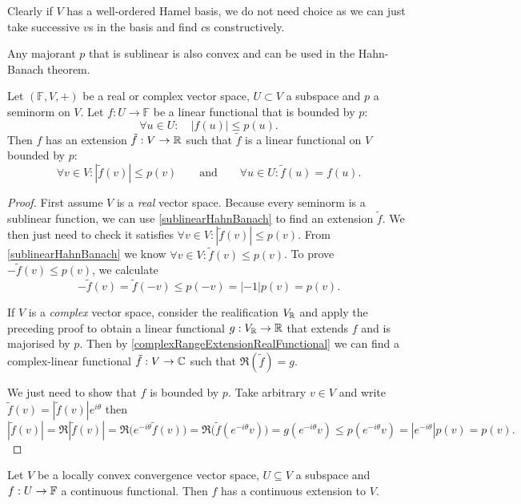 Clearly if $V$ has a well-ordered Hamel basis, we do not need choice as we can just take successive $v$s in the basis and find $c$s constructively.
\begin{corollary} \label{sublinearHahnBanach}
Any majorant $p$ that is sublinear is also convex and can be used in the Hahn-Banach theorem.
\end{corollary}
\begin{corollary} \label{seminormHahnBanach}
Let $(\mathbb{F},V,+)$ be a real or complex vector space, $U\subset V$ a subspace and $p$ a seminorm on $V$. Let $f:U\to\mathbb{F}$ be a linear functional that is bounded by $p$:
\[ \forall u\in U: \quad |f(u)| \leq p(u). \]
Then $f$ has an extension $\tilde{f}: V\to \mathbb{R}$ such that $\tilde{f}$ is a linear functional on $V$ bounded by $p$:
\[ \forall v\in V: |\tilde{f}(v)| \leq p(v) \qquad \text{and} \qquad \forall u\in U: \tilde{f}(u) = f(u). \]
\end{corollary}
\begin{proof}
First assume $V$ is a \emph{real} vector space. Because every seminorm is a sublinear function, we can use \ref{sublinearHahnBanach} to find an extension $\tilde{f}$. We then just need to check it satisfies $\forall v\in V: |\tilde{f}(v)| \leq p(v)$.
From \ref{sublinearHahnBanach} we know $\forall v\in V: \tilde{f}(v) \leq p(v)$.
To prove $-\tilde{f}(v) \leq p(v)$, we calculate
\[ -\tilde{f}(v) = \tilde{f}(-v) \leq p(-v) = |-1|p(v) = p(v). \]

If $V$ is a \emph{complex} vector space, consider the realification $V_{\mathbb{R}}$ and apply the preceding proof to obtain a linear functional $g: V_{\mathbb{R}} \to \mathbb{R}$ that extends $f$ and is majorised by $p$. Then by \ref{complexRangeExtensionRealFunctional} we can find a complex-linear functional $\tilde{f}:V \to \mathbb{C}$ such that $\Re(\tilde{f}) = g$.

We just need to show that $f$ is bounded by $p$. Take arbitrary $v\in V$ and write $\tilde{f}(v) = |\tilde{f}(v)|e^{i\theta}$ then
\[ |\tilde{f}(v)| = \Re|\tilde{f}(v)| = \Re\Big(e^{-i\theta}\tilde{f}(v)\Big) = \Re\Big(\tilde{f}(e^{-i\theta}v)\Big) = g(e^{-i\theta}v) \leq p(e^{-i\theta}v) = |e^{-i\theta}|p(v) = p(v). \]
\end{proof}
\begin{corollary} \label{}
Let $V$ be a locally convex convergence vector space, $U\subseteq V$ a subspace and $f:U\to \mathbb{F}$ a continuous functional. Then $f$ has a continuous extension to $V$.
\end{corollary}
